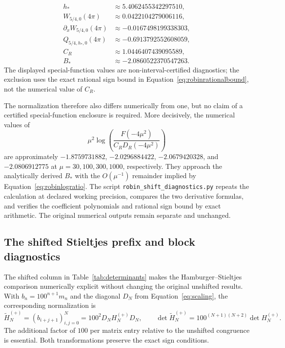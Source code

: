 \documentclass[11pt,letterpaper]{article}
\numberwithin{equation}{section}
\theoremstyle{definition}
\theoremstyle{remark}
\begin{document}
\begin{equation}
\begin{aligned}
 h_*&\approx 5.4062455342297510,\\
 W_{5/4,0}(4\pi)&\approx 0.0422104279006116,\\
 \partial_xW_{5/4,0}(4\pi)&\approx-0.0167498199338303,\\
 Q_{5/4,h_*,0}(4\pi)&\approx-0.6913792552608059,\\
 C_R&\approx1.0446407439095589,\\
 B_*&\approx-2.0860522370547263.
\end{aligned}
\label{eq:robinvalues}
\end{equation}
The displayed special-function values are non-interval-certified diagnostics; the exclusion uses the exact rational sign bound in Equation~\eqref{eq:robinrationalbound}, not the numerical value of $C_R$.

The normalization therefore also differs numerically from one, but no claim of a certified special-function enclosure is required. More decisively, the numerical values of
\begin{equation}
 \mu^2\log\!\left(\frac{F(-4\mu^2)}{C_RD_R(-4\mu^2)}\right)
 \label{eq:robinsecondnumerical}
\end{equation}
are approximately $-1.8759731882$, $-2.0296884422$, $-2.0679420328$, and $-2.0806912775$ at $\mu=30,100,300,1000$, respectively. They approach the analytically derived $B_*$ with the $O(\mu^{-1})$ remainder implied by Equation~\eqref{eq:robinlogratio}. The script \texttt{robin\_shift\_diagnostics.py} repeats the calculation at declared working precision, compares the two derivative formulas, and verifies the coefficient polynomials and rational sign bound by exact arithmetic. The original numerical outputs remain separate and unchanged.

\subsection{The shifted Stieltjes prefix and block diagnostics}
\label{subsec:shiftedprefix}
The shifted column in Table~\ref{tab:determinants} makes the Hamburger--Stieltjes comparison numerically explicit without changing the original unshifted results. With $b_n=100^{n+1}m_n$ and the diagonal $D_N$ from Equation~\eqref{eq:scaling}, the corresponding normalization is
\begin{equation}
 \widetilde H_N^{(+)}=(b_{i+j+1})_{i,j=0}^{N}
   =100^2D_NH_N^{(+)}D_N,\qquad
 \det\widetilde H_N^{(+)}
   =100^{(N+1)(N+2)}\det H_N^{(+)}.
 \label{eq:shiftedtowerscaling}
\end{equation}
The additional factor of $100$ per matrix entry relative to the unshifted congruence is essential. Both transformations preserve the exact sign conditions.
\end{document}

